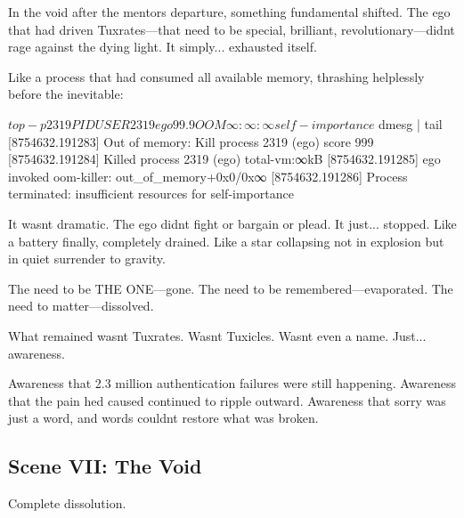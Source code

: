 In the void after the mentors\textquotesingle{} departure, something fundamental shifted. The ego that had driven Tuxrates---that need to be special, brilliant, revolutionary---didn\textquotesingle t rage against the dying light. It simply... exhausted itself.

Like a process that had consumed all available memory, thrashing helplessly before the inevitable:

\begin{codeblock}
$ top -p 2319
PID   USER  %
2319  ego   99.9 OOM    ∞:∞:∞ self-importance

$ dmesg | tail
[8754632.191283] Out of memory: Kill process 2319 (ego) score 999
[8754632.191284] Killed process 2319 (ego) total-vm:∞kB
[8754632.191285] ego invoked oom-killer: out_of_memory+0x0/0x∞
[8754632.191286] Process terminated: insufficient resources for self-importance
\end{codeblock}

It wasn\textquotesingle t dramatic. The ego didn\textquotesingle t fight or bargain or plead. It just... stopped. Like a battery finally, completely drained. Like a star collapsing not in explosion but in quiet surrender to gravity.

The need to be THE ONE---gone. The need to be remembered---evaporated. The need to matter---dissolved.

What remained wasn\textquotesingle t Tuxrates. Wasn\textquotesingle t Tuxicles. Wasn\textquotesingle t even a name. Just... awareness.

Awareness that 2.3 million authentication failures were still happening. Awareness that the pain he\textquotesingle d caused continued to ripple outward. Awareness that sorry was just a word, and words couldn\textquotesingle t restore what was broken.

\bookdivider

\subsection{Scene VII: The Void}\label{scene-vii-the-void}

Complete dissolution.

